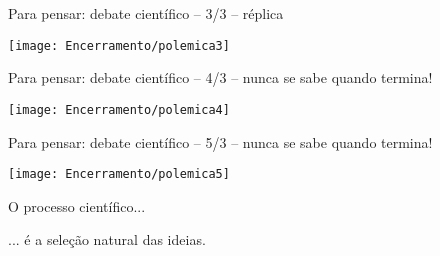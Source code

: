 \documentclass{beamer}
\begin{document}
\begin{frame}{\tiny Para pensar: debate científico -- 3/3 -- réplica}
  \begin{center}
    \texttt{[image: Encerramento/polemica3]}
  \end{center}
\end{frame}

\begin{frame}{\tiny Para pensar: debate científico -- 4/3 -- nunca se sabe quando termina!}
  \begin{center}
    \texttt{[image: Encerramento/polemica4]}
  \end{center}
\end{frame}

\begin{frame}{\tiny Para pensar: debate científico -- 5/3 -- nunca se sabe quando termina!}
  \begin{center}
    \texttt{[image: Encerramento/polemica5]}
  \end{center}
\end{frame}

\begin{frame}
  \begin{center}
    O processo científico...

    \bigskip
    \bigskip
    ... é a seleção natural das ideias.
  \end{center}
\end{frame}
\end{document}
